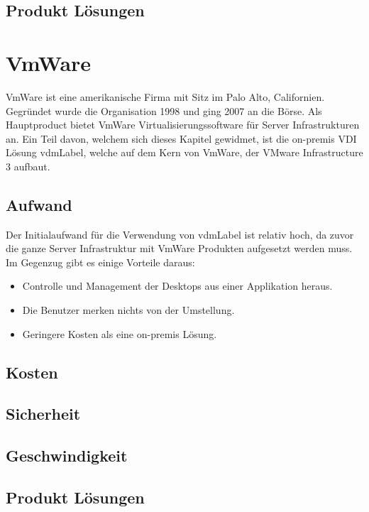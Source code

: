 \subsection{Produkt Lösungen}



\section{VmWare}
VmWare ist eine amerikanische Firma mit Sitz im Palo Alto, Californien. Gegründet wurde die Organisation 1998 und ging 2007 an die Börse.
Als Hauptproduct bietet VmWare Virtualisierungssoftware für Server Infrastrukturen an. Ein Teil davon, welchem sich dieses Kapitel gewidmet, ist die on-premis VDI Lösung \Gls{vdmLabel}, welche auf dem Kern von VmWare, der VMware Infrastructure 3 aufbaut.

\subsection{Aufwand}
Der Initialaufwand für die Verwendung von \Gls{vdmLabel} ist relativ hoch, da zuvor die ganze Server Infrastruktur mit VmWare Produkten aufgesetzt werden muss.
Im Gegenzug gibt es einige Vorteile daraus:
\begin{itemize}
	\item Controlle und Management der Desktops aus einer Applikation heraus.
	\item Die Benutzer merken nichts von der Umstellung.
	\item Geringere Kosten als eine on-premis Lösung.
\end{itemize}


\subsection{Kosten}

\subsection{Sicherheit}

\subsection{Geschwindigkeit}

\subsection{Produkt Lösungen}






